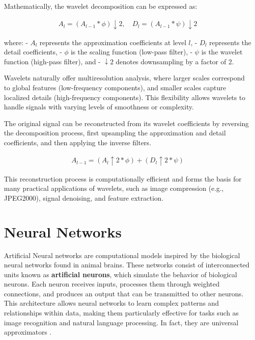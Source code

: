 Mathematically, the wavelet decomposition can be expressed as:

\begin{align}
  A_l = (A_{l-1} * \phi) \downarrow 2, \quad D_l = (A_{l-1} * \psi) \downarrow 2
\end{align}

where:
- \( A_l \) represents the approximation coefficients at level \( l \),
- \( D_l \) represents the detail coefficients,
- \( \phi \) is the scaling function (low-pass filter),
- \( \psi \) is the wavelet function (high-pass filter), and
- \( \downarrow 2 \) denotes downsampling by a factor of 2.

Wavelets naturally offer multiresolution analysis, where larger scales correspond to global features (low-frequency components), and smaller scales capture localized details (high-frequency components). This flexibility allows wavelets to handle signals with varying levels of smoothness or complexity.

The original signal can be reconstructed from its wavelet coefficients by reversing the decomposition process, first upsampling the approximation and detail coefficients, and then applying the inverse filters.

\begin{align}
  A_{l-1} = (A_l \uparrow 2 * \phi) + (D_l \uparrow 2 * \psi)  
\end{align}

This reconstruction process is computationally efficient and forms the basis for many practical applications of wavelets, such as image compression (e.g., JPEG2000), signal denoising, and feature extraction.


\section{Neural Networks}

Artificial Neural networks are computational models inspired by the biological neural networks found in animal brains. These networks consist of interconnected units known as \textbf{artificial neurons}, which simulate the behavior of biological neurons. Each neuron receives inputs, processes them through weighted connections, and produces an output that can be transmitted to other neurons. This architecture allows neural networks to learn complex patterns and relationships within data, making them particularly effective for tasks such as image recognition and natural language processing. In fact, they are universal approximators .

